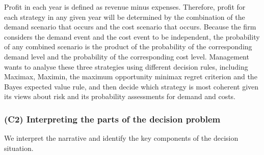 	\medskip
	Profit in each year is defined as revenue minus expenses. Therefore, profit for each strategy in any given year will
	be determined by the combination of the demand scenario that occurs and the cost scenario that occurs. Because the
	firm considers the demand event and the cost event to be independent, the probability of any combined scenario is
	the product of the probability of the corresponding demand level and the probability of the corresponding cost
	level. Management wants to analyse these three strategies using different decision rules, including Maximax, Maximin,
	the maximum opportunity minimax regret criterion and the Bayes expected value rule, and then decide which strategy
	is most coherent given its views about risk and its probability assessments for demand and costs.
	
	
	\subsubsection{(C2) Interpreting the parts of the decision problem}\label{subsubsec:example2-c2}
	
	We interpret the narrative and identify the key components of the decision situation.
	
